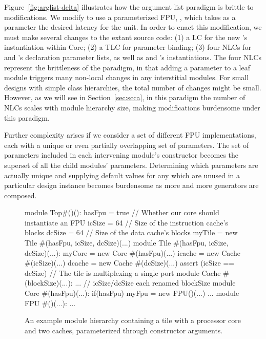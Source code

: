Figure~\ref{fig:arglist-delta} illustrates how the argument list paradigm is brittle to modifications. 
We modify  to use a parameterized FPU, , which takes as a parameter the desired latency for the unit.
In order to enact this modification, we must make several changes to the extant source code:
(1) a LC for the new 's instantiation within Core;
(2) a TLC for  parameter binding;
(3) four NLCs for  and 's declaration parameter lists, as well as  and 's instantiations.
The four NLCs represent the brittleness of the paradigm, in that adding a parameter to a leaf  module triggers many non-local changes in any interstitial modules.
For small designs with simple class hierarchies, the total number of changes might be small.
However, as we will see in Section~\ref{sec:scca}, in this paradigm the number of NLCs scales with module hierarchy size, making modifications burdensome under this paradigm.

Further complexity arises if we consider a set of different FPU implementations, each with a unique or even partially overlapping set of parameters.
The set of parameters included in each intervening module's constructor becomes the superset of all the child modules' parameters.
Determining which parameters are actually unique and supplying default values for any which are unused in a particular design instance becomes burdensome
as more and more generators are composed.

\begin{figure}
\centering
\begin{phdl}
module Top#()():
  hasFpu = true  // Whether our core should instantiate an FPU
  icSize = 64    // Size of the instruction cache's blocks
  dcSize = 64    // Size of the data cache's blocks
  myTile = new Tile #(hasFpu, icSize, dcSize)(...)
module Tile #(hasFpu, icSize, dcSize)(...):
  myCore = new Core  #(hasFpu)(...)
  icache = new Cache #(icSize)(...)
  dcache = new Cache #(dcSize)(...)
  assert (icSize == dcSize)         // The tile is multiplexing a single port
module Cache #(blockSize)(...): ... // icSize/dcSize each renamed blockSize
module Core #(hasFpu)(...):
  if(hasFpu) myFpu = new FPU()(...) ...
module FPU #()(...): ...
\end{phdl} 
\caption{An example module hierarchy containing a tile with a processor core and two caches, parameterized through constructor arguments.}
\label{fig:arglist}
\end{figure}

